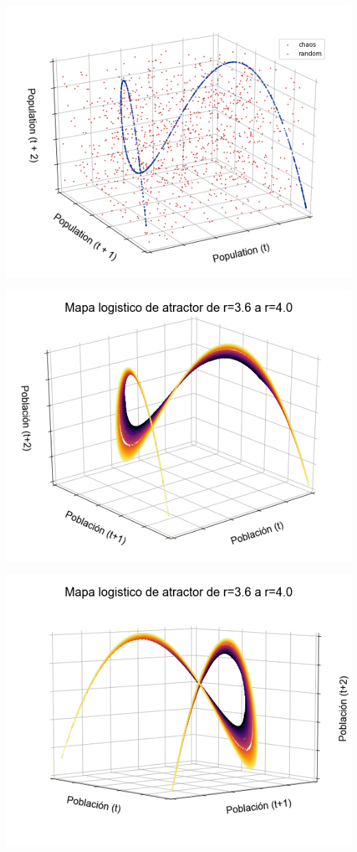 \documentclass[a4paper,12pt]{article}
\begin{document}
\begin{center}
\includegraphics[scale=0.5]{13.png}
\end{center}
\begin{center}
\includegraphics[scale=0.5]{14.png}
\end{center}
\begin{center}
\includegraphics[scale=0.5]{15.png}
\end{center}
\end{document}
